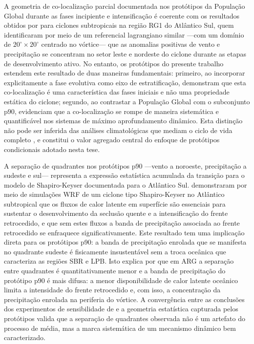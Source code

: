 A geometria de co-localização parcial documentada nos protótipos da População Global durante as fases incipiente e intensificação é coerente com os resultados obtidos por \citet{cardoso2022synoptic} para ciclones subtropicais na região RG1 do Atlântico Sul, quem identificaram por meio de um referencial lagrangiano similar —com um domínio de $20^{\circ} \times 20^{\circ}$ centrado no vórtice— que as anomalias positivas de vento e precipitação se concentram no setor leste e nordeste do ciclone durante as etapas de desenvolvimento ativo. No entanto, os protótipos do presente trabalho estendem este resultado de duas maneiras fundamentais: primeiro, ao incorporar explicitamente a fase evolutiva como eixo de estratificação, demonstram que esta co-localização é uma característica das fases iniciais e não uma propriedade estática do ciclone; segundo, ao contrastar a População Global com o subconjunto p90, evidenciam que a co-localização se rompe de maneira sistemática e quantificável nos sistemas de máximo aprofundamento dinâmico. Esta distinção não pode ser inferida das análises climatológicas que mediam o ciclo de vida completo \citep{gramcianinov2023impact}, e constitui o valor agregado central do enfoque de protótipos condicionais adotado nesta tese.


A separação de quadrantes nos protótipos p90 —vento a noroeste, precipitação a sudeste e sul— representa a expressão estatística acumulada da transição para o modelo de Shapiro-Keyser documentada para o Atlântico Sul. \citet{gozzo2013air} demonstraram por meio de simulações WRF de um ciclone tipo Shapiro-Keyser no Atlântico subtropical que os fluxos de calor latente em superfície são essenciais para sustentar o desenvolvimento da seclusão quente e a intensificação do frente retrocedido, e que sem estes fluxos a banda de precipitação associada ao frente retrocedido se enfraquece significativamente. Este resultado tem uma implicação direta para os protótipos p90: a banda de precipitação enrolada que se manifesta no quadrante sudeste é fisicamente insustentável sem a troca oceânica que caracteriza as regiões SBR e LPB. Isto explica por que em ARG a separação entre quadrantes é quantitativamente menor e a banda de precipitação do protótipo p90 é mais difusa: a menor disponibilidade de calor latente oceânico limita a intensidade do frente retrocedido e, com isso, a concentração da precipitação enrolada na periferia do vórtice. A convergência entre as conclusões dos experimentos de sensibilidade de \citet{gozzo2013air} e a geometria estatística capturada pelos protótipos valida que a separação de quadrantes observada não é um artefato do processo de média, mas a marca sistemática de um mecanismo dinâmico bem caracterizado.

